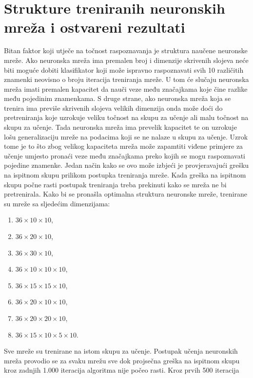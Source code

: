 \section{Strukture treniranih neuronskih mreža i ostvareni rezultati}
\label{sec:strukture-treniranih-neuronskih-mreza-i-ostvareni-rezultati}
Bitan faktor koji utječe na točnost raspoznavanja je struktura naučene neuronske mreže. Ako neuronska mreža ima premalen
broj i dimenzije skrivenih slojeva neće biti moguće dobiti klasifikator koji može ispravno raspoznavati svih 10
različitih znamenki neovisno o broju iteracija treniranja mreže. U tom će slučaju neuronska mreža imati premalen
kapacitet da nauči veze među značajkama koje čine razlike među pojedinim znamenkama. S druge strane, ako neuronska mreža
koja se trenira ima previše skrivenih slojeva velikih dimenzija onda može doći do pretreniranja koje uzrokuje veliku
točnost na skupu za učenje ali malu točnost na skupu za učenje. Tada neuronska mreža ima prevelik kapacitet te on
uzrokuje lošu generalizaciju mreže na podacima koji se ne nalaze u skupu za učenje. Uzrok tome je to što zbog velikog
kapaciteta mreža može zapamtiti viđene primjere za učenje umjesto pronaći veze među značajkama preko kojih se mogu
raspoznavati pojedine znamenke. Jedan način kako se ovo može izbjeći je provjeravajući grešku na ispitnom skupu prilikom
postupka treniranja mreže. Kada greška na ispitnom skupu počne rasti postupak treniranja treba prekinuti kako se mreža
ne bi pretrenirala. Kako bi se pronašla optimalna struktura neuronske mreže, trenirane su mreže sa sljedećim
dimenzijama:
\begin{enumerate}
    \item $36 \times 10 \times 10$,
    \item $36 \times 20 \times 10$,
    \item $36 \times 30 \times 10$,
    \item $36 \times 10 \times 10 \times 10$,
    \item $36 \times 15 \times 15 \times 10$,
    \item $36 \times 20 \times 10 \times 10$,
    \item $36 \times 20 \times 20 \times 10$,
    \item $36 \times 15 \times 10 \times 5 \times 10$.
\end{enumerate}
Sve mreže su trenirane na istom skupu za učenje. Postupak učenja neuronskih mreža provodio se za svaku mrežu sve dok
projsečna greška na ispitnom skupu kroz zadnjih 1.000 iteracija algoritma nije počeo rasti. Kroz prvih 500 iteracija
